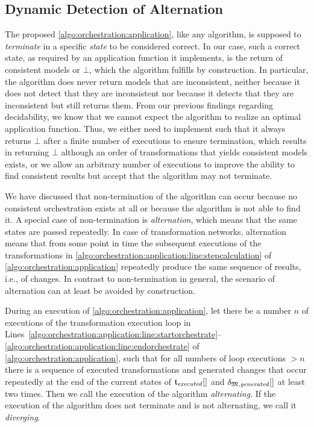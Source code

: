 \subsection{Dynamic Detection of Alternation}
\label{chap:orchestration:conservative:alternation}

The proposed \autoref{algo:orchestration:application}, like any algorithm, is supposed to \emph{terminate} in a specific \emph{state} to be considered correct.
In our case, such a correct state, as required by an application function it implements, is the return of consistent models or $\bot$, which the algorithm fulfills by construction.
In particular, the algorithm does never return models that are inconsistent, neither because it does not detect that they are inconsistent nor because it detects that they are inconsistent but still returns them.
From our previous findings regarding decidability, we know that we cannot expect the algorithm to realize an optimal application function.
Thus, we either need to implement  such that it always returns $\bot$ after a finite number of executions to ensure termination, which results in returning $\bot$ although an order of transformations that yields consistent models exists, or we allow an arbitrary number of executions to improve the ability to find consistent results but accept that the algorithm may not terminate.

We have discussed that non-termination of the algorithm can occur because no consistent orchestration exists at all or because the algorithm is not able to find it.
A special case of non-termination is \emph{alternation}, which means that the same states are passed repeatedly. 
In case of transformation networks, alternation means that from some point in time the subsequent executions of the transformations in \autoref{algo:orchestration:application:line:stepcalculation} of \autoref{algo:orchestration:application} repeatedly produce the same sequence of results, i.e., of changes.
In contrast to non-termination in general, the scenario of alternation can at least be avoided by construction.

\begin{definition}
    \label{def:applyalternation}
    During an execution of \autoref{algo:orchestration:application}, let there be a number $n$ of executions of the transformation execution loop in Lines~\ref{algo:orchestration:application:line:startorchestrate}--\ref{algo:orchestration:application:line:endorchestrate} of \autoref{algo:orchestration:application}, such that for all numbers of loop executions $> n$ there is a sequence of executed transformations and generated changes that occur repeatedly at the end of the current states of $\applyalgexecuted$ and $\applyalggenerated$ at least two times.
    Then we call the execution of the algorithm \emph{alternating}.
    If the execution of the algorithm does not terminate and is not alternating, we call it \emph{diverging}.
\end{definition}

